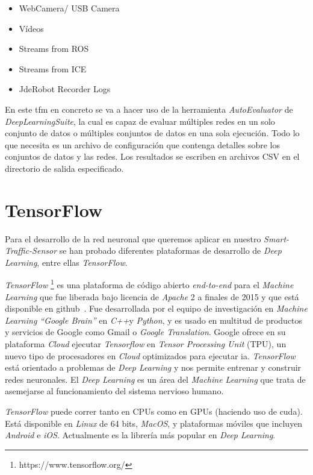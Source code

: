 \begin{itemize}
    \item WebCamera/ USB Camera
    \item Vídeos
    \item Streams from ROS
    \item Streams from ICE
    \item JdeRobot Recorder Logs
\end{itemize}

En este \acrshort{tfm} en concreto se va a hacer uso de la herramienta \textit{AutoEvaluator} de \textit{DeepLearningSuite}, la cual es capaz de evaluar múltiples redes en un solo conjunto de datos o múltiples conjuntos de datos en una sola ejecución. Todo lo que necesita es un archivo de configuración que contenga detalles sobre los conjuntos de datos y las redes. Los resultados se escriben en archivos CSV en el directorio de salida especificado.

\section{TensorFlow}
Para el desarrollo de la red neuronal que queremos aplicar en nuestro \textit{Smart-Traffic-Sensor} se  han probado diferentes plataformas de desarrollo de \textit{Deep Learning}, entre ellas \textit{TensorFlow}.

\textit{TensorFlow} \footnote{https://www.tensorflow.org/} es una plataforma de código abierto \textit{end-to-end} para el \textit{Machine Learning} que fue liberada bajo licencia de \textit{Apache} 2 a finales de 2015 y que está disponible en github~\cite{github_tensorflow}. Fue desarrollada por el equipo de investigación en \textit{Machine Learning “Google Brain”}  en \textit{C++}y \textit{Python}, y es usado en multitud de productos y servicios de Google como Gmail o \textit{Google Translation}. Google ofrece en su plataforma \textit{Cloud} ejecutar \textit{Tensorflow} en \textit{Tensor Processing Unit} (TPU), un nuevo tipo de procesadores en \textit{Cloud} optimizados para ejecutar \acrfull{ia}.  \textit{TensorFlow} está orientado a problemas de \textit{Deep Learning} y nos permite entrenar y construir redes neuronales. El \textit{Deep Learning} es un área del \textit{Machine Learning} que trata de asemejarse al funcionamiento del sistema nervioso humano.

\textit{TensorFlow} puede correr tanto en CPUs como en GPUs (haciendo uso de \acrfull{cuda}). Está disponible en \textit{Linux} de 64 bits, \textit{MacOS}, y plataformas móviles que incluyen \textit{Android} e \textit{iOS}. Actualmente es la librería más popular en \textit{
Deep Learning}.

